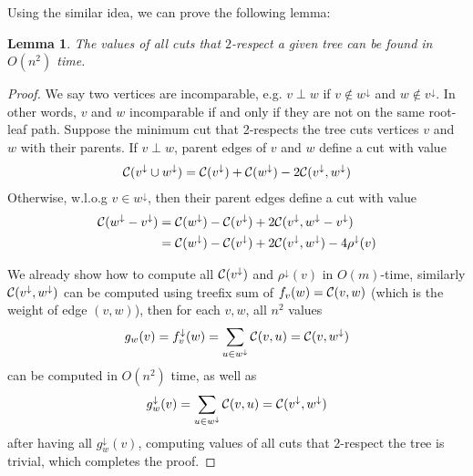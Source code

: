 \documentclass[11pt]{article}
\newcommand{\descendants}[1]{#1^\downarrow}
\newcommand{\cutval}[1]{{\cal C}(#1)}
\newcommand{\crossweight}[2]{{\cal C}(#1,#2)}
\theoremstyle{plain}
\newtheorem{lemma}{Lemma}[section]
\begin{document}
Using the similar idea, we can prove the following lemma:

\begin{lemma}
    \label{lemma:respect}
    The values of all cuts that $2$-respect a given tree can be found in $O(n^2)$ time.
\end{lemma}

\begin{proof}
    We say two vertices are incomparable, e.g. $v\perp w$ if $v \notin \descendants{w}$ and $w \notin \descendants{v}$.  In other words, $v$ and $w$ incomparable if and only if they are not on the same root-leaf path. Suppose the minimum cut that 2-respects the tree cuts vertices $v$ and $w$ with their parents. If $v\perp w$, parent edges of $v$ and $w$ define a cut with value
    \begin{align*}
        \cutval{\descendants{v}\cup\descendants{w}} =\cutval{\descendants{v}}+\cutval{\descendants{w}} -2\crossweight{\descendants{v}}{\descendants{w}} 
    \end{align*}
    Otherwise, w.l.o.g $v \in \descendants{w}$, then their parent edges define a cut with value
    \begin{align*}
        \cutval{\descendants{w}-\descendants{v}}&=\cutval{\descendants{w}}-\cutval{\descendants{v}}+2\crossweight{\descendants{v}}{\descendants{w}-\descendants{v}}\\
        &=\cutval{\descendants{w}}-\cutval{\descendants{v}}+2\crossweight{\descendants{v}}{\descendants{w}}-4\descendants{\rho}(v)
    \end{align*}
    
    We already show how to compute all $\cutval{\descendants{v}}$ and $\descendants{\rho}(v)$ in $O(m)$-time, similarly $\crossweight{\descendants{v}}{\descendants{w}}$ can be computed using treefix sum of $f_v(w)=\crossweight{v}{w}$ (which is the weight of edge $(v,w)$), then for each $v,w$, all $n^2$ values
    \begin{align*}
        g_w(v)=\descendants{f_v}(w)=\sum_{u\in\descendants{w}}\crossweight{v}{u}=\crossweight{v}{\descendants{w}}
    \end{align*}
    can be computed in $O(n^2)$ time, as well as
    \begin{align*}
        \descendants{g_w}(v)=\sum_{u\in\descendants{w}}\crossweight{v}{u}=\crossweight{\descendants{v}}{\descendants{w}}
    \end{align*}
    after having all $\descendants{g_w}(v)$, computing values of all cuts that $2$-respect the tree is trivial, which completes the proof.
\end{proof}
\end{document}
